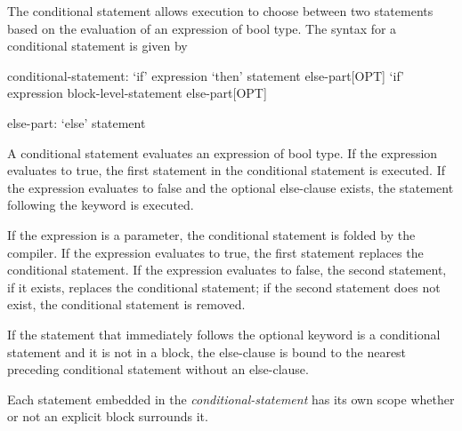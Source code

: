The conditional statement allows execution to choose between two
statements based on the evaluation of an expression of bool type. The
syntax for a conditional statement is given by
\begin{syntax}
conditional-statement:
  `if' expression `then' statement else-part[OPT]
  `if' expression block-level-statement else-part[OPT]

else-part:
  `else' statement
\end{syntax}

A conditional statement evaluates an expression of bool type. If the
expression evaluates to true, the first statement in the conditional
statement is executed.  If the expression evaluates to false and the
optional else-clause exists, the statement following the
 keyword is executed.

If the expression is a parameter, the conditional statement is folded
by the compiler. If the expression evaluates to true, the first
statement replaces the conditional statement. If the expression
evaluates to false, the second statement, if it exists, replaces the
conditional statement; if the second statement does not exist, the
conditional statement is removed.

If the statement that immediately follows the optional 
keyword is a conditional statement and it is not in a block, the
else-clause is bound to the nearest preceding conditional statement
without an else-clause.

Each statement embedded in the {\em conditional-statement} has its own
scope whether or not an explicit block surrounds it.
